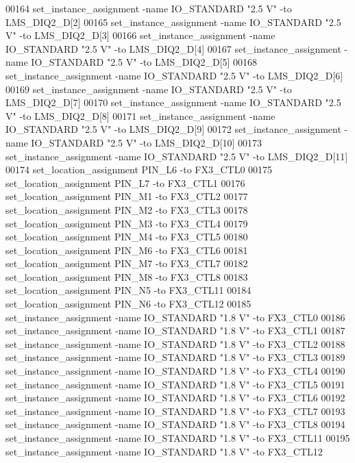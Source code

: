 \begin{DoxyCode}
00164 set\_instance\_assignment -name IO\_STANDARD "2.\textcolor{vhdllogic}{5} V" -to LMS\_DIQ2\_D[2]
00165 set\_instance\_assignment -name IO\_STANDARD "2.\textcolor{vhdllogic}{5} V" -to LMS\_DIQ2\_D[3]
00166 set\_instance\_assignment -name IO\_STANDARD "2.\textcolor{vhdllogic}{5} V" -to LMS\_DIQ2\_D[4]
00167 set\_instance\_assignment -name IO\_STANDARD "2.\textcolor{vhdllogic}{5} V" -to LMS\_DIQ2\_D[5]
00168 set\_instance\_assignment -name IO\_STANDARD "2.\textcolor{vhdllogic}{5} V" -to LMS\_DIQ2\_D[6]
00169 set\_instance\_assignment -name IO\_STANDARD "2.\textcolor{vhdllogic}{5} V" -to LMS\_DIQ2\_D[7]
00170 set\_instance\_assignment -name IO\_STANDARD "2.\textcolor{vhdllogic}{5} V" -to LMS\_DIQ2\_D[8]
00171 set\_instance\_assignment -name IO\_STANDARD "2.\textcolor{vhdllogic}{5} V" -to LMS\_DIQ2\_D[9]
00172 set\_instance\_assignment -name IO\_STANDARD "2.\textcolor{vhdllogic}{5} V" -to LMS\_DIQ2\_D[10]
00173 set\_instance\_assignment -name IO\_STANDARD "2.\textcolor{vhdllogic}{5} V" -to LMS\_DIQ2\_D[11]
00174 set\_location\_assignment PIN\_L6 -to FX3\_CTL0
00175 set\_location\_assignment PIN\_L7 -to FX3\_CTL1
00176 set\_location\_assignment PIN\_M1 -to FX3\_CTL2
00177 set\_location\_assignment PIN\_M2 -to FX3\_CTL3
00178 set\_location\_assignment PIN\_M3 -to FX3\_CTL4
00179 set\_location\_assignment PIN\_M4 -to FX3\_CTL5
00180 set\_location\_assignment PIN\_M6 -to FX3\_CTL6
00181 set\_location\_assignment PIN\_M7 -to FX3\_CTL7
00182 set\_location\_assignment PIN\_M8 -to FX3\_CTL8
00183 set\_location\_assignment PIN\_N5 -to FX3\_CTL11
00184 set\_location\_assignment PIN\_N6 -to FX3\_CTL12
00185 set\_instance\_assignment -name IO\_STANDARD "1.\textcolor{vhdllogic}{8} V" -to FX3\_CTL0
00186 set\_instance\_assignment -name IO\_STANDARD "1.\textcolor{vhdllogic}{8} V" -to FX3\_CTL1
00187 set\_instance\_assignment -name IO\_STANDARD "1.\textcolor{vhdllogic}{8} V" -to FX3\_CTL2
00188 set\_instance\_assignment -name IO\_STANDARD "1.\textcolor{vhdllogic}{8} V" -to FX3\_CTL3
00189 set\_instance\_assignment -name IO\_STANDARD "1.\textcolor{vhdllogic}{8} V" -to FX3\_CTL4
00190 set\_instance\_assignment -name IO\_STANDARD "1.\textcolor{vhdllogic}{8} V" -to FX3\_CTL5
00191 set\_instance\_assignment -name IO\_STANDARD "1.\textcolor{vhdllogic}{8} V" -to FX3\_CTL6
00192 set\_instance\_assignment -name IO\_STANDARD "1.\textcolor{vhdllogic}{8} V" -to FX3\_CTL7
00193 set\_instance\_assignment -name IO\_STANDARD "1.\textcolor{vhdllogic}{8} V" -to FX3\_CTL8
00194 set\_instance\_assignment -name IO\_STANDARD "1.\textcolor{vhdllogic}{8} V" -to FX3\_CTL11
00195 set\_instance\_assignment -name IO\_STANDARD "1.\textcolor{vhdllogic}{8} V" -to FX3\_CTL12

\end{DoxyCode}
